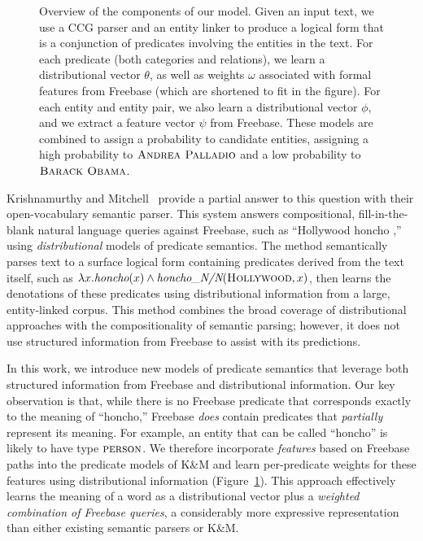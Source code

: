 \documentclass[11pt]{article}
\newcommand{\figref}[1]{Figure~\ref{fig:#1}}
\newcommand{\blank}{\underline{\hspace{.5cm}}}
\newcommand{\lexicalpredicate}[1]{\ensuremath{\textit{#1}}}
\newcommand{\formalpredicate}[1]{\ensuremath{\textsc{#1}}}
\newcommand{\entity}[1]{\ensuremath{\textsc{#1}}}
\begin{document}
\begin{figure*}[ht]
  \vspace{-.1in}
  \caption{Overview of the components of our model.  Given an input
  text, we use a CCG parser and an entity linker to produce a logical
  form that is a conjunction of predicates involving the entities in
  the text.  For each predicate (both categories and relations), we
  learn a distributional vector $\theta$, as well as weights $\omega$
  associated with formal features from Freebase (which are shortened
  to fit in the figure).  For each entity and entity pair, we also
  learn a distributional vector $\phi$, and we extract a feature
  vector $\psi$ from Freebase.  These models are combined to assign a
  probability to candidate entities, assigning a high probability to
  \entity{Andrea Palladio} and a low probability to \entity{Barack
  Obama}.}
  \label{fig:overview}
  \vspace{-.1in}
\end{figure*}

Krishnamurthy and
Mitchell~
provide a partial answer to this question with their open-vocabulary
semantic parser. This system answers compositional, fill-in-the-blank
natural language queries against Freebase, such as ``Hollywood honcho
\blank{},'' using \emph{distributional} models of predicate
semantics. The method semantically parses text to a surface logical
form containing predicates derived from the text itself, such as
$\lambda x.\lexicalpredicate{honcho}(x) \land
\lexicalpredicate{honcho\_N/N}(\entity{Hollywood}, x)$, then learns the
denotations of these predicates using distributional information from
a large, entity-linked corpus. This method combines the broad coverage
of distributional approaches with the compositionality of semantic
parsing; however, it does not use structured information from Freebase
to assist with its predictions.

In this work, we introduce new models of predicate semantics that
leverage both structured information from Freebase and distributional
information. Our key observation is that, while there is no Freebase
predicate that corresponds exactly to the meaning of ``honcho,''
Freebase \emph{does} contain predicates that \emph{partially}
represent its meaning. For example, an entity that can be called
``honcho'' is likely to have type \formalpredicate{person}. We therefore
incorporate \emph{features} based on Freebase paths into the predicate
models of K\&M and learn per-predicate weights for these features
using distributional information (\figref{overview}). This approach
effectively learns the meaning of a word as a distributional vector
plus a \emph{weighted combination of Freebase queries}, a considerably
more expressive representation than either existing semantic parsers
or K\&M.
\end{document}
